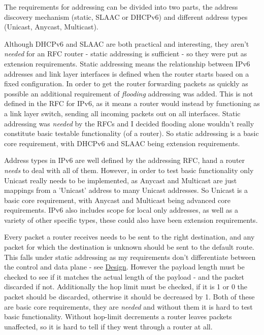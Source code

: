 \documentclass[12pt,a4paper,twoside,openright]{report}
\begin{document}
\bigskip

The requirements for addressing can be divided into two parts, the address discovery mechanism (static, SLAAC\cite{slaac_rfc} or DHCPv6\cite{dhcpv6_rfc}) and different address types (Unicast, Anycast, Multicast).  

Although DHCPv6 and SLAAC are both practical and interesting, they aren't \textit{needed} for an RFC router - static addressing is sufficient - so they were put as extension requirements.  Static addressing means the relationship between IPv6 addresses and link layer interfaces is defined when the router starts based on a fixed configuration. In order to get the router forwarding packets as quickly as possible an additional requirement of \textit{flooding} addressing was added.  This is not defined in the RFC for IPv6, as it means a router would instead by functioning as a link layer switch, sending all incoming packets out on all interfaces. Static addressing was \textit{needed} by the RFCs and I decided flooding alone wouldn't really constitute basic testable functionality (of a router). So static addressing is a basic core requirement, with DHCPv6 and SLAAC being extension requirements.

Address types in IPv6 are well defined by the addressing RFC\cite{ipv6_rfc_adr}, hand a router \textit{needs} to deal with all of them.  However, in order to test basic functionality only Unicast really needs to be implemented, as Anycast and Multicast are just mappings from a 'Unicast' address to many Unicast addresses. So Unicast is a basic core requirement, with Anycast and Multicast being advanced core requirements. IPv6 also includes scope for local only addresses, as well as a variety of other specific types, these could also have been extension requirements.

\bigskip

Every packet a router receives needs to be sent to the right destination, and any packet for which the destination is unknown should be sent to the default route. This falls under static addressing as my requirements don't differentiate between the control and data plane - see \hyperref[sec::design]{Design}.  However the payload length must be checked to see if it matches the actual length of the payload - and the packet discarded if not.  Additionally the hop limit must be checked, if it is 1 or 0 the packet should be discarded, otherwise it should be decreased by 1.  Both of these are basic core requirements, they are \textit{needed} and without them it is hard to test basic functionality. Without hop-limit decrements a router leaves packets unaffected, so it is hard to tell if they went through a router at all.
\end{document}
